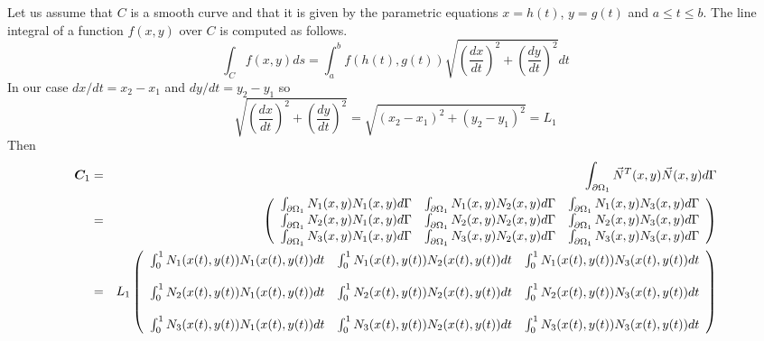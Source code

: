 Let us assume that $C$ is a smooth curve and that it is given by the 
parametric equations $x=h(t)$, $y=g(t)$ and $a\leq t \leq b$. The line integral 
of a function $f(x,y)$ over $C$ is computed as follows. 
\[
\int_C f(x,y) ds = \int_a^b f(h(t),g(t)) \sqrt{\left(\frac{dx}{dt}\right)^2 + \left(\frac{dy}{dt}\right)^2} dt
\]
In our case $dx/dt=x_2-x_1$ and $dy/dt=y_2-y_1$ so 
\[
\sqrt{\left(\frac{dx}{dt}\right)^2 + \left(\frac{dy}{dt}\right)^2}
=\sqrt{(x_2-x_1)^2+(y_2-y_1)^2} = L_1
\]
Then 
\begin{eqnarray}
{\bm C}_1
&=&\int_{\partial\Omega_1} \vec{N}^T(x,y) \vec{N}(x,y) d\Gamma \nonumber\\
&=&
\left(
\begin{array}{ccc}
\int_{\partial\Omega_1} N_1(x,y)N_1(x,y) d\Gamma & 
\int_{\partial\Omega_1} N_1(x,y)N_2(x,y) d\Gamma &
\int_{\partial\Omega_1} N_1(x,y)N_3(x,y) d\Gamma \\
\int_{\partial\Omega_1} N_2(x,y)N_1(x,y) d\Gamma & 
\int_{\partial\Omega_1} N_2(x,y)N_2(x,y) d\Gamma &
\int_{\partial\Omega_1} N_2(x,y)N_3(x,y) d\Gamma \\
\int_{\partial\Omega_1} N_3(x,y)N_1(x,y) d\Gamma & 
\int_{\partial\Omega_1} N_3(x,y)N_2(x,y) d\Gamma &
\int_{\partial\Omega_1} N_3(x,y)N_3(x,y) d\Gamma 
\end{array}
\right) \nonumber\\
&=&
L_1
\left(
\begin{array}{ccc}
\int_{0}^1 N_1(x(t),y(t))N_1(x(t),y(t)) dt & 
\int_{0}^1 N_1(x(t),y(t))N_2(x(t),y(t)) dt &
\int_{0}^1 N_1(x(t),y(t))N_3(x(t),y(t)) dt \\\\
\int_{0}^1 N_2(x(t),y(t))N_1(x(t),y(t)) dt & 
\int_{0}^1 N_2(x(t),y(t))N_2(x(t),y(t)) dt &
\int_{0}^1 N_2(x(t),y(t))N_3(x(t),y(t)) dt \\\\
\int_{0}^1 N_3(x(t),y(t))N_1(x(t),y(t)) dt & 
\int_{0}^1 N_3(x(t),y(t))N_2(x(t),y(t)) dt &
\int_{0}^1 N_3(x(t),y(t))N_3(x(t),y(t)) dt
\end{array}
\right) \nonumber\\
\end{eqnarray}

